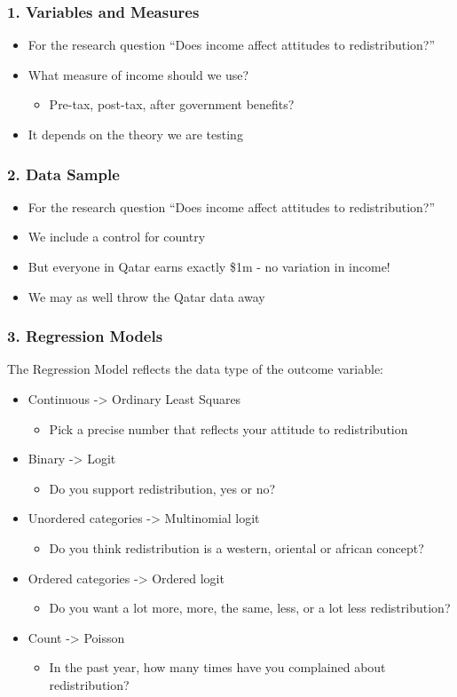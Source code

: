 \documentclass[xcolor=x11names,compress]{beamer}\usepackage[]{graphicx}\usepackage[]{color}
\renewcommand{\(}{\begin{columns}}
\renewcommand{\)}{\end{columns}}
\newcommand{\<}[1]{\begin{column}{#1}}
\renewcommand{\>}{\end{column}}
\begin{document}
\begin{frame}
\frametitle{1. Variables and Measures}
\begin{itemize}
\item For the research question ``Does income affect attitudes to redistribution?''
\pause
\item What measure of income should we use?
\pause
\begin{itemize}
\item Pre-tax, post-tax, after government benefits?
\end{itemize}
\item It depends on the theory we are testing
\end{itemize}
\end{frame}

\begin{frame}
\frametitle{2. Data Sample}
\begin{itemize}
\item For the research question ``Does income affect attitudes to redistribution?''
\pause
\item We include a control for country
\pause
\item But everyone in Qatar earns exactly \$1m - no variation in income!
\pause
\item We may as well throw the Qatar data away
\end{itemize}
\end{frame}

\begin{frame}
\frametitle{3. Regression Models}
The Regression Model reflects the data type of the outcome variable:
\begin{itemize}
\item Continuous -> Ordinary Least Squares  
\begin{itemize}
\item Pick a precise number that reflects your attitude to redistribution
\end{itemize}
\item Binary -> Logit  
\begin{itemize}
\item Do you support redistribution, yes or no?
\end{itemize}
\item Unordered categories -> Multinomial logit  
\begin{itemize}
\item Do you think redistribution is a western, oriental or african concept?
\end{itemize}
\item Ordered categories -> Ordered logit  
\begin{itemize}
\item Do you want a lot more, more, the same, less, or a lot less redistribution?
\end{itemize}
\item Count -> Poisson  
\begin{itemize}
\item In the past year, how many times have you complained about redistribution?
\end{itemize}
\end{itemize}
\end{frame}
\end{document}
